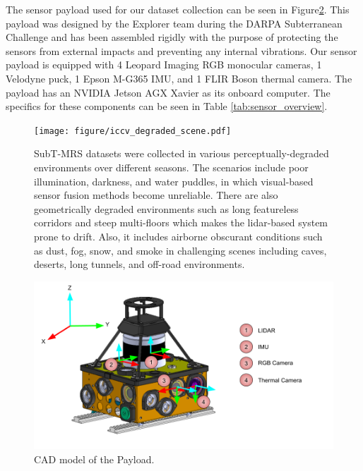 \documentclass[10pt,twocolumn,letterpaper]{article}
\begin{document}
The sensor payload used for our dataset collection can be seen in Figure\ref{fig:payload}. This payload was designed by the Explorer team during the DARPA Subterranean Challenge and has been assembled rigidly with the purpose of protecting the sensors from external impacts and preventing any internal vibrations. Our sensor payload is equipped with 4 Leopard Imaging RGB monocular cameras, 1 Velodyne puck, 1 Epson M-G365 IMU, and 1 FLIR Boson thermal camera. The payload has an NVIDIA Jetson AGX Xavier as its onboard computer. The specifics for these components can be seen in Table \ref{tab:sensor_overview}.


\begin{figure} []
   \centering
    \texttt{[image: figure/iccv\_degraded\_scene.pdf]}

    \caption{SubT-MRS datasets were collected in various perceptually-degraded environments over different seasons. The scenarios include poor illumination, darkness, and water puddles, in which visual-based sensor fusion methods become unreliable. There are also geometrically degraded environments such as long featureless corridors and steep multi-floors which makes the lidar-based system prone to drift. Also, it includes airborne obscurant conditions such as dust, fog, snow, and smoke in challenging scenes including caves, deserts, long tunnels, and off-road environments.} 
    \label{fig:various_terrains}
\end{figure}



\begin{figure}[]
    \centering
    \includegraphics[width=0.95\linewidth]{figure/CAD.png}
    \caption{CAD model of the Payload.}
    \label{fig:payload}
\end{figure}
\end{document}
